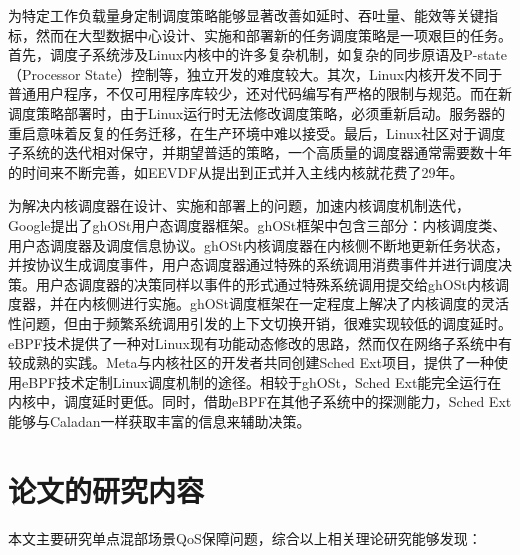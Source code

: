 为特定工作负载量身定制调度策略能够显著改善如延时、吞吐量、能效等关键指标，然而在大型数据中心设计、实施和部署新的任务调度策略是一项艰巨的任务\citep{humphries2021ghost}。首先，调度子系统涉及Linux内核中的许多复杂机制，如复杂的同步原语及P-state（Processor State）控制等，独立开发的难度较大。其次，Linux内核开发不同于普通用户程序，不仅可用程序库较少，还对代码编写有严格的限制与规范。而在新调度策略部署时，由于Linux运行时无法修改调度策略，必须重新启动。服务器的重启意味着反复的任务迁移，在生产环境中难以接受。最后，Linux社区对于调度子系统的迭代相对保守，并期望普适的策略，一个高质量的调度器通常需要数十年的时间来不断完善\citep{agache2020firecracker}，如EEVDF从提出到正式并入主线内核就花费了29年。

为解决内核调度器在设计、实施和部署上的问题，加速内核调度机制迭代，Google提出了ghOSt\citep{humphries2021ghost}用户态调度器框架。ghOSt框架中包含三部分：内核调度类、用户态调度器及调度信息协议。ghOSt内核调度器在内核侧不断地更新任务状态，并按协议生成调度事件，用户态调度器通过特殊的系统调用消费事件并进行调度决策。用户态调度器的决策同样以事件的形式通过特殊系统调用提交给ghOSt内核调度器，并在内核侧进行实施。ghOSt调度框架在一定程度上解决了内核调度的灵活性问题，但由于频繁系统调用引发的上下文切换开销，很难实现较低的调度延时。eBPF技术提供了一种对Linux现有功能动态修改的思路，然而仅在网络子系统中有较成熟的实践。Meta与内核社区的开发者共同创建Sched Ext项目，提供了一种使用eBPF技术定制Linux调度机制的途径。相较于ghOSt，Sched Ext能完全运行在内核中，调度延时更低。同时，借助eBPF在其他子系统中的探测能力，Sched Ext能够与Caladan一样获取丰富的信息来辅助决策。

\section{论文的研究内容}

本文主要研究单点混部场景QoS保障问题，综合以上相关理论研究能够发现：


